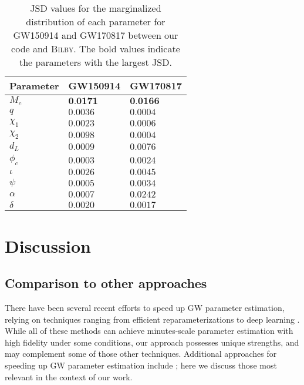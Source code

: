 \documentclass[twocolumn]{aastex631}
\begin{document}
\begin{table}[hbt!]
    \begin{center}
    \begin{tabular}{ l l l}
    \hline
    \hline
    Parameter & GW150914 & GW170817\\
    \hline
        $M_c$ & $\textbf{0.0171}$ & $\textbf{0.0166}$ \\
        $q$ & $0.0036$ & $0.0004$ \\
        $\chi_1$ & $0.0023$ & $0.0006$ \\
        $\chi_2$ & $0.0098$ & $0.0004$ \\
        $d_L$ & $0.0009$ & $0.0076$ \\
        $\phi_c$ & $0.0003$ & $0.0024$ \\
        $\iota$ & $0.0026$ & $0.0045$ \\
        $\psi$ & $0.0005$ & $0.0034$ \\
        $\alpha$ & $0.0007$ & $0.0242$ \\
        $\delta$ & $0.0020$ & $0.0017$ \\
    \hline
    \hline
    \end{tabular}
    \caption{JSD values for the marginalized distribution of each parameter for
    GW150914 and GW170817 between our code and \textsc{Bilby}. The bold values
    indicate the parameters with the largest JSD.}
    \label{tab:JSD}
    \end{center}
\end{table}

\section{Discussion}
\label{sec: Discussion}

\subsection{Comparison to other approaches}

There have been several recent efforts to speed up GW parameter estimation,
relying on techniques ranging from efficient reparameterizations
\citep{Islam:2022afg,Roulet:2022kot} to deep learning
\citep{Dax:2021tsq,Dax:2022pxd}. While all of these methods can achieve
minutes-scale parameter estimation with high fidelity under some conditions,
our approach possesses unique strengths, and may complement some of those other
techniques. Additional approaches for speeding up GW parameter estimation include
\cite{Canizares:2014fya,Smith:2016qas,Lee:2022jpn,Wofford:2022ykb,Lange:2018pyp,Williams:2021qyt,Morisaki:2021ngj};
here we discuss those most relevant in the context of our work.
\end{document}
